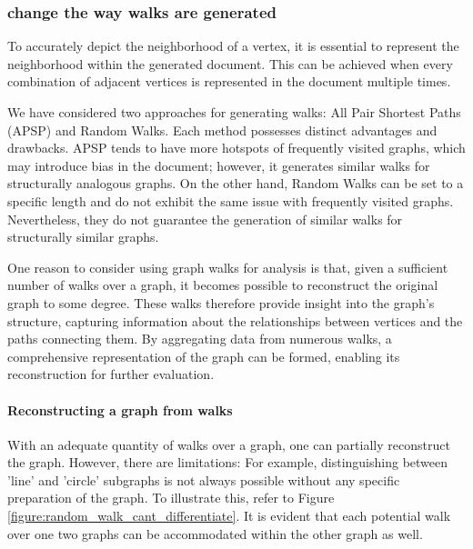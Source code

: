 \subsubsection{change the way walks are generated}
To accurately depict the neighborhood of a vertex, it is essential to represent the neighborhood within the generated document. This can be achieved when every combination of adjacent vertices is represented in the document multiple times.

We have considered two approaches for generating walks: All Pair Shortest Paths (APSP) and Random Walks. Each method possesses distinct advantages and drawbacks. APSP tends to have more hotspots of frequently visited graphs, which may introduce bias in the document; however, it generates similar walks for structurally analogous graphs. On the other hand, Random Walks can be set to a specific length and do not exhibit the same issue with frequently visited graphs. Nevertheless, they do not guarantee the generation of similar walks for structurally similar graphs.

One reason to consider using graph walks for analysis is that, given a sufficient number of walks over a graph, it becomes possible to reconstruct the original graph to some degree. These walks therefore provide insight into the graph's structure, capturing information about the relationships between vertices and the paths connecting them. By aggregating data from numerous walks, a comprehensive representation of the graph can be formed, enabling its reconstruction for further evaluation.

\paragraph{Reconstructing a graph from walks}
With an adequate quantity of walks over a graph, one can partially reconstruct the graph. However, there are limitations: For example, distinguishing between 'line' and 'circle' subgraphs is not always possible without any specific preparation of the graph. To illustrate this, refer to Figure \ref{figure:random_walk_cant_differentiate}. It is evident that each potential walk over one two graphs can be accommodated within the other graph as well.


